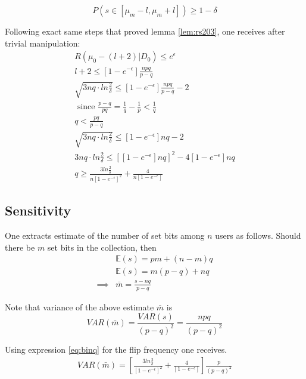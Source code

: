 \documentclass[11pt]{article}
\newcommand{\E}{\mathbb{E}} %
\begin{document}
\begin{prop}
\begin{pf}
\[ P(s \in [\mu_m - l, \mu_m + l ]) \ge 1- \delta\]

Following exact same steps that proved lemma \ref{lem:rs203}, one receives after trivial manipulation:
 \begin{align}
R(\mu_0 - (l+2) | D_0)  \le e^\epsilon \\
l + 2 \le \left [ 1 - e^{-\epsilon}\right ] \frac { npq}{p - q}  \\
\sqrt{3nq \cdot ln\frac{2}{\delta}} \le \left [ 1 - e^{-\epsilon}\right ] \frac { npq}{p - q} - 2 \\
 \text{ since } \frac{p-q}{pq}  = \frac{1}{q} - \frac{1}{p} < \frac{1}{q} \\
  q< \frac {pq}{p - q}  \\
 \sqrt{3nq \cdot ln\frac{2}{\delta}} \le \left [ 1 - e^{-\epsilon}\right ] nq - 2 \\
3nq \cdot ln\frac{2}{\delta}  \le \left [ \left [ 1 - e^{-\epsilon}\right ] nq \right ]^2 - 4 \left [ 1 - e^{-\epsilon}\right ]nq\\
 q \ge \frac  { 3  ln\frac{2}{\delta}}  { n \left [ 1 - e^{-\epsilon}\right ] ^2}  + \frac{4}{n \left [ 1 - e^{-\epsilon}\right ] } \label{eq:binq}
\end{align}
\end{pf}
\end{prop}

\subsection{Sensitivity}


One extracts estimate of the number of set bits among $n$ users as follows.  Should there be $m$ set bits in the collection, then
\begin{align*}
& \E(s) = pm + (n-m)q \\
& \E(s) = m(p-q) + nq \\
\implies & \bar{m} = \frac{s - nq}{p-q}
\end{align*}

Note that variance of the above estimate $\bar{m}$ is
\[ VAR(\bar{m}) = \frac{VAR(s)}{ (p-q)^2} = \frac{npq}{(p-q)^2}\]

Using expression \ref{eq:binq} for the flip frequency one receives.
\begin{align}
VAR(\bar{m}) = \left [ \frac  { 3  ln\frac{2}{\delta}}  {\left [ 1 - e^{-\epsilon}\right ] ^2}  + \frac{4}{\left [ 1 - e^{-\epsilon}\right ] }  \right ] \frac{p}{(p-q)^2}
\end{align}
\end{document}

